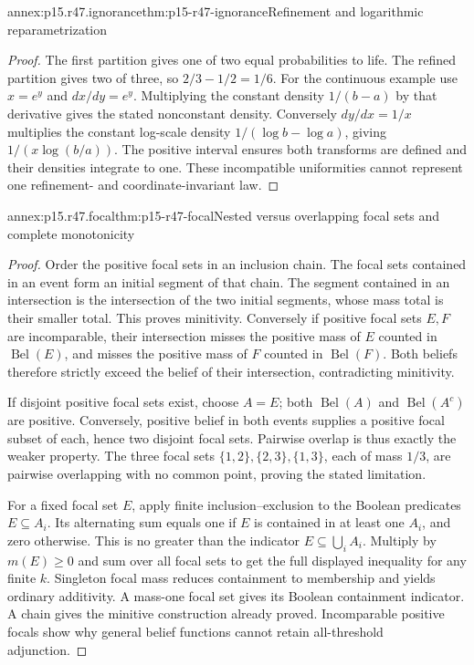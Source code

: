 \begin{annexitem}{annex:p15.r47.ignorance}{thm:p15-r47-ignorance}{Refinement and logarithmic reparametrization}
\begin{proof}
The first partition gives one of two equal probabilities to life. The
refined partition gives two of three, so \(2/3-1/2=1/6\). For the
continuous example use \(x=e^y\) and \(dx/dy=e^y\). Multiplying the
constant density \(1/(b-a)\) by that derivative gives the stated
nonconstant density. Conversely \(dy/dx=1/x\) multiplies the constant
log-scale density \(1/(\log b-\log a)\), giving
\(1/(x\log(b/a))\). The positive interval ensures both transforms are
defined and their densities integrate to one. These incompatible
uniformities cannot represent one refinement- and coordinate-invariant law.
\end{proof}\end{annexitem}

\begin{annexitem}{annex:p15.r47.focal}{thm:p15-r47-focal}{Nested versus overlapping focal sets and complete monotonicity}
\begin{proof}
Order the positive focal sets in an inclusion chain. The focal sets
contained in an event form an initial segment of that chain. The segment
contained in an intersection is the intersection of the two initial
segments, whose mass total is their smaller total. This proves minitivity.
Conversely if positive focal sets \(E,F\) are incomparable, their
intersection misses the positive mass of \(E\) counted in
\(\operatorname{Bel}(E)\), and misses the positive mass of \(F\)
counted in \(\operatorname{Bel}(F)\). Both beliefs therefore strictly
exceed the belief of their intersection, contradicting minitivity.

If disjoint positive focal sets exist, choose \(A=E\); both
\(\operatorname{Bel}(A)\) and \(\operatorname{Bel}(A^c)\) are positive.
Conversely, positive belief in both events supplies a positive focal
subset of each, hence two disjoint focal sets. Pairwise overlap is thus
exactly the weaker property. The three focal sets
\(\{1,2\},\{2,3\},\{1,3\}\), each of mass \(1/3\), are pairwise
overlapping with no common point, proving the stated limitation.

For a fixed focal set \(E\), apply finite inclusion--exclusion to the
Boolean predicates \(E\subseteq A_i\). Its alternating sum equals
one if \(E\) is contained in at least one \(A_i\), and zero otherwise.
This is no greater than the indicator \(E\subseteq\bigcup_iA_i\).
Multiply by \(m(E)\geq0\) and sum over all focal sets to get the full
displayed inequality for any finite \(k\). Singleton focal mass reduces
containment to membership and yields ordinary additivity. A mass-one
focal set gives its Boolean containment indicator. A chain gives the
minitive construction already proved. Incomparable positive focals show
why general belief functions cannot retain all-threshold adjunction.
\end{proof}\end{annexitem}

